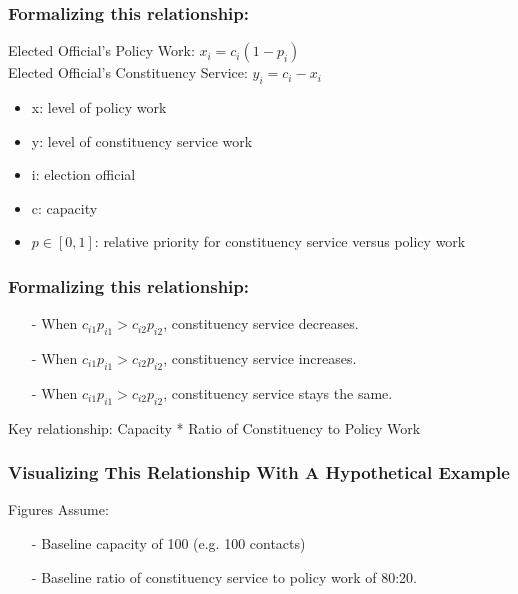 \documentclass[xcolor=dvipsnames]{beamer}
\begin{document}
\begin{frame}
\frametitle{Formalizing this relationship:}

Elected Official's Policy Work: $x_i=c_i(1-p_i) $ \\
Elected Official's Constituency Service: $y_i=c_i-x_i$

\begin{itemize}
\item x: level of policy work
\item y: level of constituency service work
\item i: election official
\item c: capacity
\item $p \in [0,1]$: relative priority for constituency service versus policy work 
\end{itemize}
\end{frame}
\begin{frame}
\frametitle{Formalizing this relationship:}
\begin{itemize}
\item[-] When $c_{i1}p_{i1} > c_{i2}p_{i2}$, constituency service decreases. 
\item[-]When $c_{i1}p_{i1} > c_{i2}p_{i2}$, constituency service increases. 
\item[-]When $c_{i1}p_{i1} > c_{i2}p_{i2}$, constituency service stays the same.
\end{itemize}
\bigskip \pause
Key relationship: Capacity * Ratio of Constituency to Policy Work

\end{frame}
\begin{frame}
\frametitle{Visualizing This Relationship With A Hypothetical Example}
Figures Assume: 
\begin{itemize}
\item[-]Baseline capacity of 100 (e.g. 100 contacts)
\item[-]Baseline ratio of constituency service to policy work of 80:20. 
\end{itemize}
\end{frame}
\begin{frame}[plain]
\begin{center}
\end{center}
\end{frame}
\end{document}
